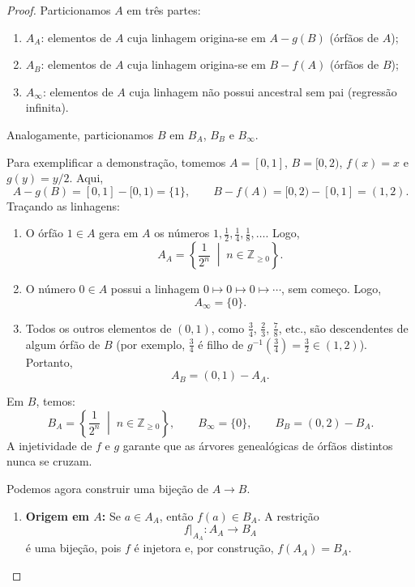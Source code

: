 \begin{proof}
    Particionamos \(A\) em três partes:
    \begin{enumerate}
        \item \(A_A\): elementos de \(A\) cuja linhagem origina-se em \(A - g(B)\) (órfãos de \(A\));
        \item \(A_B\): elementos de \(A\) cuja linhagem origina-se em \(B - f(A)\) (órfãos de \(B\));
        \item \(A_\infty\): elementos de \(A\) cuja linhagem não possui ancestral sem pai (regressão infinita).
    \end{enumerate}
    Analogamente, particionamos \(B\) em \(B_A\), \(B_B\) e \(B_\infty\).

    Para exemplificar a demonstração, tomemos \(A = [0,1]\), \(B = [0,2)\), \(f(x) = x\) e \(g(y) = y/2\). Aqui,
    \[
        A - g(B) = [0,1] - [0,1) = \{1\}, \qquad
        B - f(A) = [0,2) - [0,1] = (1,2).
    \]
    Traçando as linhagens:
    \begin{enumerate}
        \item O órfão \(1 \in A\) gera em \(A\) os números \(1, \frac{1}{2}, \frac{1}{4}, \frac{1}{8}, \dots\). Logo,
              \[
                  A_A = \left\{ \frac{1}{2^n} \;\middle|\; n \in \mathbb{Z}_{\ge 0} \right\}.
              \]
        \item O número \(0 \in A\) possui a linhagem \(0 \mapsto 0 \mapsto 0 \mapsto \cdots\), sem começo. Logo,
              \[
                  A_\infty = \{0\}.
              \]
        \item Todos os outros elementos de \((0,1)\), como \(\frac{3}{4}\), \(\frac{2}{3}\), \(\frac{7}{8}\), etc., são descendentes de algum órfão de \(B\) (por exemplo, \(\frac{3}{4}\) é filho de \(g^{-1}(\frac{3}{4}) = \frac{3}{2} \in (1,2)\)). Portanto,
              \[
                  A_B = (0,1) - A_A.
              \]
    \end{enumerate}
    Em \(B\), temos:
    \[
        B_A = \left\{ \frac{1}{2^n} \;\middle|\; n \in \mathbb{Z}_{\ge 0} \right\}, \qquad
        B_\infty = \{0\}, \qquad
        B_B = (0,2) - B_A.
    \]
    A injetividade de \(f\) e \(g\) garante que as árvores genealógicas de órfãos distintos nunca se cruzam.

    Podemos agora construir uma bijeção de \(A \to B\).

    \begin{enumerate}
        \item \textbf{Origem em \(A\):} Se \(a \in A_A\), então \(f(a) \in B_A\). A restrição
              \[
                  f|_{A_A}: A_A \to B_A
              \]
              é uma bijeção, pois \(f\) é injetora e, por construção, \(f(A_A) = B_A\).


\end{enumerate}
\end{proof}
